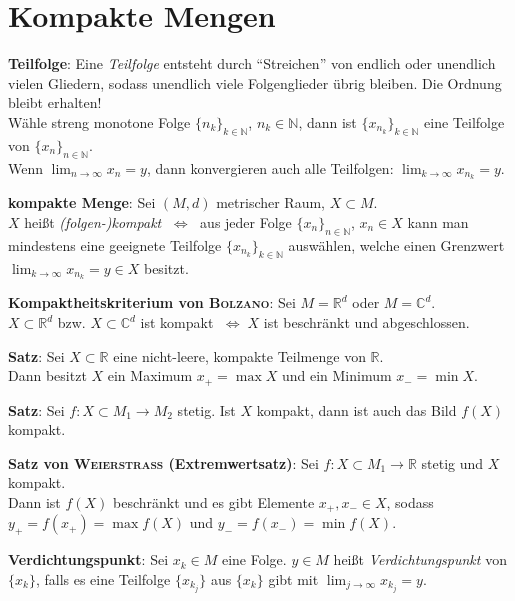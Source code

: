 \section{%
    Kompakte Mengen%
}

\textbf{Teilfolge}: Eine \emph{Teilfolge} entsteht durch "`Streichen"' von
endlich oder unendlich vielen Gliedern, sodass unendlich viele Folgenglieder
übrig bleiben.
Die Ordnung bleibt erhalten! \\
Wähle streng monotone Folge $\{n_k\}_{k \in \mathbb{N}}$,
$n_k \in \mathbb{N}$, dann ist $\{x_{n_k}\}_{k \in \mathbb{N}}$ eine Teilfolge
von $\{x_n\}_{n \in \mathbb{N}}$. \\
Wenn $\lim_{n \to \infty} x_n = y$, dann konvergieren auch alle Teilfolgen:
$\lim_{k \to \infty} x_{n_k} = y$.

\textbf{kompakte Menge}: Sei $(M,d)$ metrischer Raum, $X \subset M$. \\
$X$ heißt \emph{(folgen-)kompakt} $\;\Leftrightarrow\;$ aus jeder Folge
$\{x_n\}_{n \in \mathbb{N}}$, $x_n \in X$ kann man mindestens eine geeignete
Teilfolge $\{x_{n_k}\}_{k \in \mathbb{N}}$ auswählen, welche einen Grenzwert
$\lim_{k \to \infty} x_{n_k} = y \in X$ besitzt.

\textbf{Kompaktheitskriterium von \textsc{Bolzano}}: Sei $M = \mathbb{R}^d$
oder $M = \mathbb{C}^d$. \\
$X \subset \mathbb{R}^d$ bzw. $X \subset \mathbb{C}^d$ ist kompakt
$\;\Leftrightarrow\; X$ ist beschränkt und abgeschlossen.

\linie

\textbf{Satz}: Sei $X \subset \mathbb{R}$ eine nicht-leere, kompakte
Teilmenge von $\mathbb{R}$. \\
Dann besitzt $X$ ein Maximum $x_+ = \max X$ und ein Minimum $x_- = \min X$.

\textbf{Satz}: Sei $f: X \subset M_1 \rightarrow M_2$ stetig.
Ist $X$ kompakt, dann ist auch das Bild $f(X)$ kompakt.

\textbf{Satz von \textsc{Weierstrass} (Extremwertsatz)}:
Sei $f: X \subset M_1 \rightarrow \mathbb{R}$ stetig und $X$ kompakt. \\
Dann ist $f(X)$ beschränkt und es gibt Elemente $x_+, x_- \in X$, sodass
$y_+ = f(x_+) = \max f(X)$ und $y_- = f(x_-) = \min f(X)$.

\linie

\textbf{Verdichtungspunkt}: Sei $x_k \in M$ eine Folge.
$y \in M$ heißt \emph{Verdichtungspunkt} von $\{x_k\}$,
falls es eine Teilfolge $\{x_{k_j}\}$ aus $\{x_k\}$ gibt mit
$\lim_{j \to \infty} x_{k_j} = y$.


